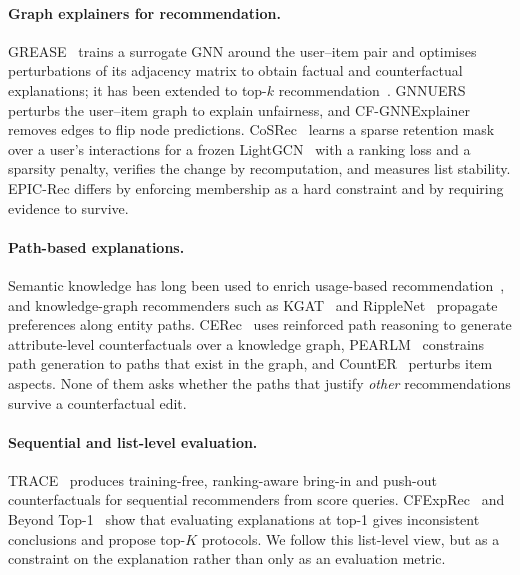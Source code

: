\documentclass[11pt]{article}
\begin{document}
\paragraph{Graph explainers for recommendation.} GREASE~\cite{chen2022grease} trains a surrogate GNN around the
user--item pair and optimises perturbations of its adjacency matrix to obtain factual and counterfactual explanations;
it has been extended to top-$k$ recommendation~\cite{chen2025grease}. GNNUERS~\cite{medda2024gnnuers} perturbs the
user--item graph to explain unfairness, and CF-GNNExplainer~\cite{lucic2022cfgnn} removes edges to flip node
predictions. CoSRec~\cite{zhang2026cosrec} learns a sparse retention mask over a user's interactions for a frozen
LightGCN~\cite{he2020lightgcn} with a ranking loss and a sparsity penalty, verifies the change by recomputation, and
measures list stability. EPIC-Rec differs by enforcing membership as a hard constraint and by requiring evidence to
survive.

\paragraph{Path-based explanations.} Semantic knowledge has long been used to enrich usage-based
recommendation~\cite{abrishami2012semantic}, and knowledge-graph recommenders such as KGAT~\cite{wang2019kgat} and
RippleNet~\cite{wang2018ripplenet} propagate preferences along entity paths. CERec~\cite{wang2024cerec} uses
reinforced path reasoning to generate attribute-level counterfactuals over a knowledge graph,
PEARLM~\cite{balloccu2023pearlm} constrains path generation to paths that exist in the graph, and
CountER~\cite{tan2021counter} perturbs item aspects. None of them asks whether the paths that justify \emph{other}
recommendations survive a counterfactual edit.

\paragraph{Sequential and list-level evaluation.} TRACE~\cite{kim2026trace} produces training-free, ranking-aware
bring-in and push-out counterfactuals for sequential recommenders from score queries.
CFExpRec~\cite{nguyen2026cfexprec} and Beyond Top-1~\cite{mohammadi2025beyond,mohammadi2026beyond} show that
evaluating explanations at top-1 gives inconsistent conclusions and propose top-$K$ protocols. We follow this
list-level view, but as a constraint on the explanation rather than only as an evaluation metric.
\end{document}
